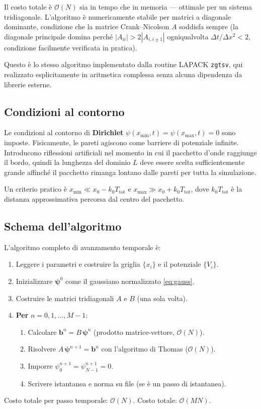 \documentclass[12pt, a4paper]{article}
\newcommand{\dt}{\Delta t}
\newcommand{\dx}{\Delta x}
\newcommand{\CN}{Crank--Nicolson}
\begin{document}
Il costo totale è $\mathcal{O}(N)$ sia in tempo che in memoria — ottimale per
un sistema tridiagonale. L'algoritmo è numericamente stabile per matrici
a diagonale dominante, condizione che la matrice \CN{} $A$ soddisfa sempre
(la diagonale principale domina perché $|A_{ii}| > 2|A_{i,i\pm 1}|$
ogniqualvolta $\dt/\dx^2 < 2$, condizione facilmente verificata in pratica).

Questo è lo stesso algoritmo implementato dalla routine LAPACK \texttt{zgtsv},
qui realizzato esplicitamente in aritmetica complessa senza alcuna dipendenza
da librerie esterne.

\subsection{Condizioni al contorno}

Le condizioni al contorno di \textbf{Dirichlet} $\psi(x_\text{min},t) =
\psi(x_\text{max},t) = 0$ sono imposte. Fisicamente, le pareti agiscono
come barriere di potenziale infinite. Introducono riflessioni artificiali
nel momento in cui il pacchetto d'onde raggiunge il bordo, quindi la
lunghezza del dominio $L$ deve essere scelta sufficientemente grande
affinché il pacchetto rimanga lontano dalle pareti per tutta la simulazione.

Un criterio pratico è $x_\text{min} \ll x_0 - k_0 T_\text{tot}$ e
$x_\text{max} \gg x_0 + k_0 T_\text{tot}$, dove $k_0 T_\text{tot}$ è
la distanza approssimativa percorsa dal centro del pacchetto.

\subsection{Schema dell'algoritmo}

L'algoritmo completo di avanzamento temporale è:

\begin{enumerate}
  \item Leggere i parametri e costruire la griglia $\{x_i\}$ e il potenziale $\{V_i\}$.
  \item Inizializzare $\boldsymbol{\psi}^0$ come il gaussiano normalizzato
        \eqref{eq:gauss}.
  \item Costruire le matrici tridiagonali $A$ e $B$ (una sola volta).
  \item \textbf{Per} $n = 0, 1, \ldots, M-1$:
  \begin{enumerate}
    \item[(a)] Calcolare $\mathbf{b}^n = B\,\boldsymbol{\psi}^n$
               (prodotto matrice-vettore, $\mathcal{O}(N)$).
    \item[(b)] Risolvere $A\,\boldsymbol{\psi}^{n+1} = \mathbf{b}^n$
               con l'algoritmo di Thomas ($\mathcal{O}(N)$).
    \item[(c)] Imporre $\psi_0^{n+1} = \psi_{N-1}^{n+1} = 0$.
    \item[(d)] Scrivere istantanea e norma su file (se è un passo di istantanea).
  \end{enumerate}
\end{enumerate}
Costo totale per passo temporale: $\mathcal{O}(N)$. Costo totale: $\mathcal{O}(MN)$.
\end{document}
